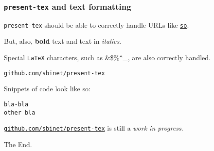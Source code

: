 \documentclass[9pt]{beamer}
\newcommand{\myblue} [1] {{\color{blue}#1}}
\begin{document}
\begin{frame}[fragile]
\frametitle{\texttt{present-tex} and text formatting}



\texttt{present-tex} should be able to correctly handle URLs like
\myblue{\href{https://github.com/sbinet/present-tex}{\texttt{so}}}.




But, also, \textbf{bold} text and text in \emph{italics}.




Special \texttt{LaTeX} characters, such as \&\$\%\texttt{\^}\_, are also correctly handled.



\myblue{\href{https://github.com/sbinet/present-tex}{\texttt{github.com/sbinet/present-tex}}}


Snippets of code look like so:




\begin{verbatim}
bla-bla
other bla

\end{verbatim}



\myblue{\href{https://github.com/sbinet/present-tex}{\texttt{github.com/sbinet/present-tex}}} is still a \emph{work in progress}.




The End.




\end{frame}
\end{document}
